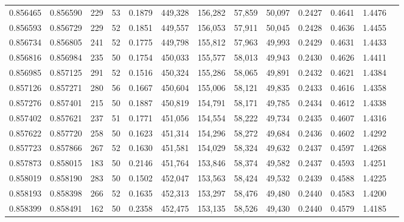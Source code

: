 \begin{tabular}{rrrrrrrrrrrrr}
0.856465 & 0.856590 &   229 &  53 &                                     0.1879 & 449,328 & 156,282 &  57,859 &  50,097 & 0.2427 & 0.4641 & 1.4476 \\
0.856593 & 0.856729 &   229 &  52 &                                     0.1851 & 449,557 & 156,053 &  57,911 &  50,045 & 0.2428 & 0.4636 & 1.4455 \\
0.856734 & 0.856805 &   241 &  52 &                                     0.1775 & 449,798 & 155,812 &  57,963 &  49,993 & 0.2429 & 0.4631 & 1.4433 \\
0.856816 & 0.856984 &   235 &  50 &                                     0.1754 & 450,033 & 155,577 &  58,013 &  49,943 & 0.2430 & 0.4626 & 1.4411 \\
0.856985 & 0.857125 &   291 &  52 &                                     0.1516 & 450,324 & 155,286 &  58,065 &  49,891 & 0.2432 & 0.4621 & 1.4384 \\
0.857126 & 0.857271 &   280 &  56 &                                     0.1667 & 450,604 & 155,006 &  58,121 &  49,835 & 0.2433 & 0.4616 & 1.4358 \\
0.857276 & 0.857401 &   215 &  50 &                                     0.1887 & 450,819 & 154,791 &  58,171 &  49,785 & 0.2434 & 0.4612 & 1.4338 \\
0.857402 & 0.857621 &   237 &  51 &                                     0.1771 & 451,056 & 154,554 &  58,222 &  49,734 & 0.2435 & 0.4607 & 1.4316 \\
0.857622 & 0.857720 &   258 &  50 &                                     0.1623 & 451,314 & 154,296 &  58,272 &  49,684 & 0.2436 & 0.4602 & 1.4292 \\
0.857723 & 0.857866 &   267 &  52 &                                     0.1630 & 451,581 & 154,029 &  58,324 &  49,632 & 0.2437 & 0.4597 & 1.4268 \\
0.857873 & 0.858015 &   183 &  50 &                                     0.2146 & 451,764 & 153,846 &  58,374 &  49,582 & 0.2437 & 0.4593 & 1.4251 \\
0.858019 & 0.858190 &   283 &  50 &                                     0.1502 & 452,047 & 153,563 &  58,424 &  49,532 & 0.2439 & 0.4588 & 1.4225 \\
0.858193 & 0.858398 &   266 &  52 &                                     0.1635 & 452,313 & 153,297 &  58,476 &  49,480 & 0.2440 & 0.4583 & 1.4200 \\
0.858399 & 0.858491 &   162 &  50 &                                     0.2358 & 452,475 & 153,135 &  58,526 &  49,430 & 0.2440 & 0.4579 & 1.4185 \\

\end{tabular}
